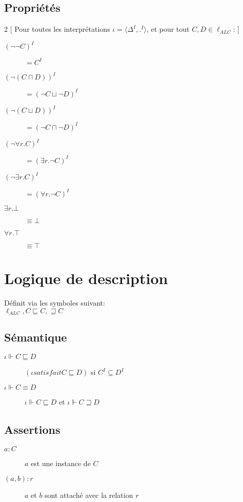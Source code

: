 \subsection{Propriétés}
\begin{multicols}{2}
[
Pour toutes les interprétations $\iota = \langle \Delta^I, .^I \rangle$, et pour tout $C,D \in \ell_{ALC}$:
]
\begin{description}
\item[$(\neg \neg C)^I$] $= C^I$
\item[$(\neg (C \sqcap D))^I$] $= ( \neg C \sqcup \neg D)^I$
\item[$(\neg (C \sqcup D))^I$] $= ( \neg C \sqcap \neg D)^I$
\item[$(\neg \forall r.C)^I$] $= (\exists r.\neg C)^I$
\item[$(\neg \exists r.C)^I$] $= (\forall r.\neg C)^I$
\item[$\exists r. \bot $] $\equiv \bot $
\item[$\forall r. \top $] $\equiv \top $
\end{description}
\end{multicols}

\section{Logique de description}
Définit via les symboles suivant:\\
$\ell_{ALC}, C \sqsubseteq C, \sqsupseteq C$\\

\subsection{Sémantique}
\begin{description}
\item[$\iota \Vdash C \sqsubseteq D$] $(\iota satisfait C \sqsubseteq D)$ si $C^I \subseteq D^I$
\item[$\iota \Vdash C \equiv D$] $\iota \Vdash C \sqsubseteq D$ et $\iota \Vdash C \sqsupseteq D$
\end{description}

\subsection{Assertions}
\begin{description}
\item[$a : C$] $a$ est une instance de $C$
\item[$(a,b) : r$] $a$ et $b$ sont attaché avec la relation $r$
\end{description}

